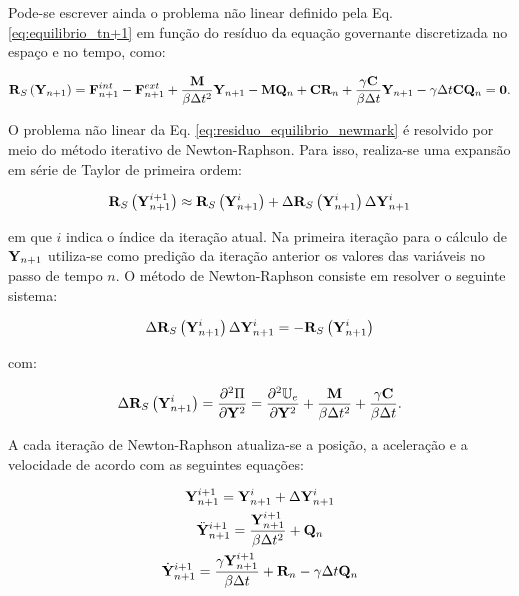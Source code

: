 \documentclass[tese_patricia]{subfiles}
\begin{document}
Pode-se escrever ainda o problema não linear definido pela Eq.
\eqref{eq:equilibrio_tn+1} em função do resíduo da equação governante
discretizada no espaço e no tempo, como:

\begin{gather}
\mathbf{R}_S\left(\mathbf{Y}_{n+1}\right) = \mathbf{F}^{int}_{n+1}- \mathbf{F}^{ext}_{n+1} + \frac{\mathbf{M}}{\beta \Delta t^2} \mathbf{Y}_{n+1}-\mathbf{M} \mathbf{Q}_n+ \mathbf{C}\mathbf{R}_n + \frac{\gamma \mathbf{C}}{\beta \Delta t}\mathbf{Y}_{n+1} - \gamma\Delta t \mathbf{C}\mathbf{Q}_n= \mathbf{0}.
\label{eq:residuo_equilibrio_newmark}
\end{gather}

O problema não linear da Eq. \eqref{eq:residuo_equilibrio_newmark} é resolvido por meio do método iterativo de Newton-Raphson. Para isso, realiza-se uma expansão em série de Taylor de primeira ordem:

\begin{gather}
\mathbf{R}_S\left(\mathbf{Y}_{n+1}^{i+1}\right) \approx \mathbf{R}_S\left(\mathbf{Y}_{n+1}^{i}\right) + \Delta\mathbf{R}_S\left(\mathbf{Y}_{n+1}^{i}\right)\Delta\mathbf{Y}_{n+1}^{i} 
\end{gather}

\noindent em que $i$ indica o índice da iteração atual. Na primeira iteração para o cálculo de $\mathbf{Y}_{n+1}$ utiliza-se como predição da iteração anterior os valores das variáveis no passo de tempo $n$. O método de Newton-Raphson consiste em resolver o seguinte sistema:

\begin{gather}
\Delta\mathbf{R}_S\left(\mathbf{Y}_{n+1}^{i}\right)\Delta\mathbf{Y}_{n+1}^{i} = -\mathbf{R}_S\left(\mathbf{Y}_{n+1}^{i}\right) \label{eq:NR}
\end{gather}

\noindent com:

\begin{gather}
\Delta\mathbf{R}_S\left(\mathbf{Y}_{n+1}^{i}\right) = \frac{\partial^{2}\Pi}{\partial\mathbf{Y}^{2}} = \frac{\partial^{2}\mathbb{U}_e}{\partial \mathbf{Y}^{2}} + \frac{\mathbf{M}}{\beta \Delta t^2} + \frac{\gamma \mathbf{C}}{\beta \Delta t}.
\end{gather}

A cada iteração de Newton-Raphson atualiza-se a posição, a aceleração e a velocidade de acordo com as seguintes equações:

\begin{gather}
\mathbf{Y}_{n+1}^{i+1} = \mathbf{Y}_{n+1}^{i} + \Delta\mathbf{Y}_{n+1}^{i} \label{UD1}\\
\ddot{\mathbf{Y}}_{n+1}^{i+1} = \frac{\mathbf{Y}_{n+1}^{i+1}}{\beta \Delta t^2} + \mathbf{Q}_n  \label{UD2} \\
\dot{\mathbf{Y}}_{n+1}^{i+1} = \frac{\gamma \mathbf{Y}_{n+1}^{i+1}}{\beta \Delta t} + \mathbf{R}_n - \gamma\Delta t \mathbf{Q}_n  \label{UD3}
\end{gather}
\end{document}
